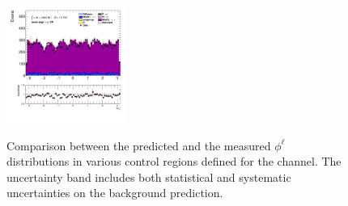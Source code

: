 \begin{figure}[!htp]
\begin{center}
			\includegraphics[width=0.35\textwidth]{chapters/chapter6_HPlus/images/taulep/lep_0_phi_SS_TAUMU.png} \\
			\end{center}
			\caption{
			Comparison between the predicted and the measured $\phi^{\ell}$ distributions in various control regions defined for the \taulep channel. The uncertainty band includes both statistical and systematic uncertainties on the background prediction. 
			}
			\label{fig:bkg-phi-lep-taulep}
		\end{figure}

